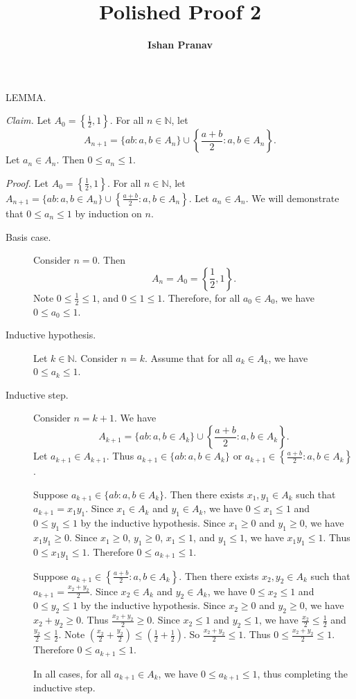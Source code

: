 \documentclass[9pt]{article}
\title{Polished Proof 2}
\author{\textbf{Ishan Pranav}}
\begin{document}
\maketitle
\noindent\small{LEMMA.}\newline

\noindent\textit{Claim. }Let $A_0=\left\{\frac{1}{2},1
\right\}$. For all $n\in\mathbb{N}$, let
\[A_{n+1}=\{ab:a,b\in A_n\}\cup\left\{\frac{a+b}{2}:a,b\in A_n\right\}.\]
Let $a_n\in A_n$. Then $0\leq a_n\leq 1$.\newline

\noindent\textit{Proof. }Let $A_0=\left\{\frac{1}{2},1
\right\}$. For all $n\in\mathbb{N}$, let
$A_{n+1}=\{ab:a,b\in A_n\}\cup\left\{\frac{a+b}{2}:a,b\in A_n\right\}$.
Let $a_n\in A_n$. We will demonstrate that $0\leq a_n\leq 1$ by induction on $n$.\newline

\begin{description}
\item[Basis case.] Consider $n=0$. Then
\[A_n=A_0=\left\{\frac{1}{2},1
\right\}.\]
Note $0\leq\frac{1}{2}\leq 1$, and $0\leq 1\leq 1$. Therefore, for all $a_0\in A_0$, we have $0\leq a_0\leq 1$.
\item[Inductive hypothesis.] Let $k\in\mathbb{N}$. Consider $n=k$. Assume that for all $a_k\in A_k$, we have $0\leq a_k\leq 1$.
\item[Inductive step.] Consider $n=k+1$. We have 
\[A_{k+1}=\{ab:a,b\in A_k\}\cup\left\{\frac{a+b}{2}:a,b\in A_k\right\}.\]
Let $a_{k+1}\in A_{k+1}$. Thus $a_{k+1}\in\{ab:a,b\in A_k\}$ or $a_{k+1}\in\left\{\frac{a+b}{2}:a,b\in A_k\right\}$.\newline

Suppose $a_{k+1}\in\{ab:a,b\in A_k\}$. Then there exists $x_1,y_1\in A_k$ such that $a_{k+1}=x_1y_1$. Since $x_1\in A_k$ and $y_1\in A_k$, we have $0\leq x_1\leq 1$ and $0\leq y_1\leq 1$ by the inductive hypothesis. Since $x_1\geq 0$ and $y_1\geq 0$, we have $x_1y_1\geq 0$. Since $x_1\geq 0$, $y_1\geq 0$, $x_1\leq 1$, and $y_1\leq 1$, we have $x_1y_1\leq 1$. Thus $0\leq x_1y_1\leq 1$. Therefore $0\leq a_{k+1}\leq 1$.\newline

Suppose $a_{k+1}\in\left\{\frac{a+b}{2}:a,b\in A_k\right\}$. Then there exists $x_2,y_2\in A_k$ such that $a_{k+1}=\frac{x_2+y_2}{2}$. Since $x_2\in A_k$ and $y_2\in A_k$, we have $0\leq x_2\leq 1$ and $0\leq y_2\leq 1$ by the inductive hypothesis. 
Since $x_2\geq 0$ and $y_2\geq 0$, we have $x_2+y_2\geq 0$. Thus $\frac{x_2+y_2}{2}\geq 0$. Since $x_2\leq 1$ and $y_2\leq 1$, we have $\frac{x_2}{2}\leq\frac{1}{2}$ and $\frac{y_2}{2}\leq\frac{1}{2}$. Note $\left(\frac{x_2}{2}+\frac{y_2}{2}\right)\leq\left(\frac{1}{2}+\frac{1}{2}\right)$. So $\frac{x_2+y_2}{2}\leq 1$. Thus $0\leq\frac{x_2+y_2}{2}\leq 1$. Therefore $0\leq a_{k+1}\leq 1$.\newline

In all cases, for all $a_{k+1}\in A_k$, we have $0\leq a_{k+1}\leq 1$, thus completing the inductive step.\newline

\end{description}
\end{document}
